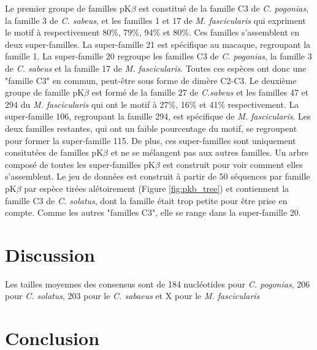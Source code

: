 \documentclass[12pt,a4paper]{article}
\begin{document}
	Le premier groupe de familles pK$\beta$ est constitué de la famille C3 de \textit{C. pogonias}, la famille 3 de \textit{C. sabeus}, et les familles 1 et 17 de \textit{M. fascicularis} qui expriment le motif à respectivement 80\%, 79\%, 94\% et 80\%. Ces familles s'assemblent en deux super-familles. La super-famille 21 est spécifique au macaque, regroupant la famille 1. La super-famille 20 regroupe les familles C3 de \textit{C. pogonias}, la famille 3 de \textit{C. sabeus} et la famille 17 de \textit{M. fascicularis}. Toutes ces espèces ont donc une "famille C3" en commun, peut-être sous forme de dimère C2-C3. Le deuxième groupe de famille pK$\beta$ est formé de la famille 27 de  \textit{C.sabeus} et les familles  47 et 294 du \textit{M. fascicularis} qui ont le motif à 27\%, 16\% et 41\% respectivement. La super-famille 106, regroupant la famille 294, est spécifique de \textit{M. fascicularis}. Les deux familles restantes, qui ont un faible pourcentage du motif, se regroupent pour former la super-famille 115. De plus, ces super-familles sont uniquement consitutées de familles pK$\beta$ et ne se mélangent pas aux autres familles.
	Un arbre composé de toutes les super-familles pK$\beta$ est construit pour voir comment elles s'assemblent. Le jeu de données est construit à partir de 50 séquences par famille pK$\beta$ par espèce tirées alétoirement (Figure \ref{fig:pkb_tree}) et contiennent la famille C3 de \textit{C. solatus}, dont la famille était trop petite pour être prise en compte. Comme les autres "familles C3", elle se range dans la super-famille 20. 

\section{Discussion}

	Les tailles moyennes des consensus sont de 184 nucléotides pour \textit{C. pogonias}, 206 pour \textit{C. solatus}, 203 pour le \textit{C. sabaeus} et X pour le \textit{M. fascicularis}


\section{Conclusion}

\newpage
\strut  ~  \mbox{}  \null
\newpage

  

%
% 
%
%
%
% 
% 
\end{document}
